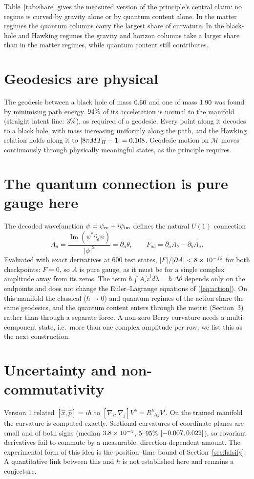 \documentclass[11pt]{article}
\begin{document}
Table~\ref{tab:share} gives the measured version of the principle's central claim: no regime is
curved by gravity alone or by quantum content alone. In the matter regimes the quantum columns
carry the largest share of curvature. In the black-hole and Hawking regimes the gravity and horizon
columns take a larger share than in the matter regimes, while quantum content still contributes.

\section{Geodesics are physical}
The geodesic between a black hole of mass $0.60$ and one of mass $1.90$ was found by
minimising path energy. $94\%$ of its acceleration is normal to the manifold (straight
latent line: $3\%$), as required of a geodesic. Every point along it decodes to a black
hole, with mass increasing uniformly along the path, and the Hawking relation holds along it to
$|8\pi MT_H-1|=0.108$. Geodesic motion on $\mathcal M$ moves continuously through physically
meaningful states, as the principle requires.

\section{The quantum connection is pure gauge here}
The decoded wavefunction $\psi=\psi_{\rm re}+i\psi_{\rm im}$ defines the natural $U(1)$ connection
\begin{equation}
A_a=\frac{\operatorname{Im}(\psi^*\partial_a\psi)}{|\psi|^2}=\partial_a\theta,\qquad F_{ab}=\partial_aA_b-\partial_bA_a.
\end{equation}
Evaluated with exact derivatives at 600 test states, $|F|/|\partial A|<8\times10^{-16}$ for both checkpoints:
$F=0$, so $A$ is pure gauge, as it must be for a single complex amplitude away from its zeros. The
term $\hbar\!\int\!A_i\dot z^i d\lambda=\hbar\,\Delta\theta$ depends only on the endpoints and
does not change the Euler--Lagrange equations of (\ref{eq:action}). On this manifold the classical
($\hbar\to0$) and quantum regimes of the action share the same geodesics, and the quantum
content enters through the metric (Section~3) rather than through a separate force. A non-zero
Berry curvature needs a multi-component state, i.e.\ more than one complex amplitude per row; we
list this as the next construction.

\section{Uncertainty and non-commutativity}
Version 1 related $[\hat x,\hat p]=i\hbar$ to $[\nabla_i,\nabla_j]V^k=R^k{}_{lij}V^l$. On the
trained manifold the curvature is computed exactly. Sectional curvatures of coordinate planes are
small and of both signs (median $3.8\times10^{-5}$, 5--95\% $[-0.007,0.022]$), so covariant derivatives fail
to commute by a measurable, direction-dependent amount. The experimental form of this idea is the position--time bound of Section~\ref{sec:falsify}. A quantitative link between this and
$\hbar$ is not established here and remains a conjecture.
\end{document}
